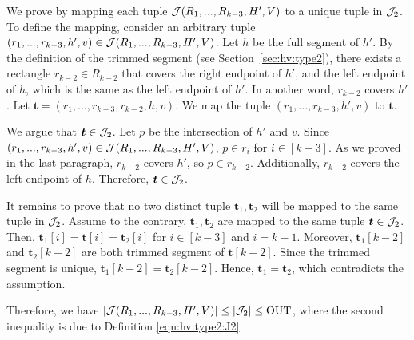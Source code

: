 We prove by mapping each tuple $\mathcal{J}(R_1,...,R_{k-3},H',V)$ to a unique tuple in $\mathcal{J}_2$. 
To define the mapping, consider an arbitrary tuple $(r_1,...,r_{k-3}, h', v) \in \mathcal{J}(R_1,...,R_{k-3},H',V)$. Let $h$ be the full segment of $h'$. By the definition of the trimmed segment (see Section~\ref{sec:hv:type2}), there exists a rectangle $r_{k-2}\in R_{k-2}$ that covers the right endpoint of $h'$, and the left endpoint of $h$, which is the same as the left endpoint of $h'$. In another word, $r_{k-2}$ covers $h'$. Let $\bm{t} = (r_1,...,r_{k-3}, r_{k-2},h,v)$. We map the tuple $(r_1,...,r_{k-3}, h', v)$ to $\bm{t}$. 

\vgap 

We argue that $\textrm{\boldmath${t}$}\in \mathcal{J}_2$. Let $p$ be the intersection of $h'$ and $v$. Since $(r_1,...,r_{k-3}, h', v) \in \mathcal{J}(R_1,...,R_{k-3},H',V)$, $p \in r_i$ for $i \in [k-3]$. As we proved in the last paragraph, $r_{k-2}$ covers $h'$, so $p \in r_{k-2}$. Additionally, $r_{k-2}$ covers the left endpoint of $h$. Therefore, $\textrm{\boldmath${t}$} \in \mathcal{J}_2$.

\vgap

It remains to prove that no two distinct tuple $\bm{t}_1, \bm{t}_2$ will be mapped to the same tuple in $\mathcal{J}_2$. Assume to the contrary, $\bm{t}_1, \bm{t}_2$ are mapped to the same tuple $\textrm{\boldmath${t}$} \in \mathcal{J}_2$. Then, $\bm{t}_1[i] = \bm{t}[i] = \bm{t}_2[i]$ for $i\in [k-3]$ and $i = k-1$. Moreover, $\bm{t}_1[k-2]$ and $\bm{t}_2[k-2]$ are both trimmed segment of $\bm{t}[k-2]$. Since the trimmed segment is unique, $\bm{t}_1[k-2] = \bm{t}_2[k-2]$. Hence, $\bm{t}_1 = \bm{t}_2$, which contradicts the assumption.  

\vgap

Therefore, we have $|\mathcal{J}(R_1,...,R_{k-3},H',V)| \le |\mathcal{J}_2| \le \mathrm{OUT}$, where the second inequality is due to Definition \eqref{eqn:hv:type2:J2}. 